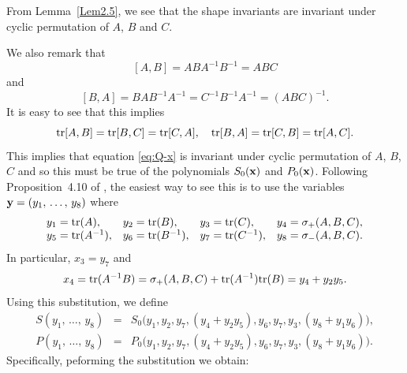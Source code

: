 \documentclass[11pt]{amsart}
\numberwithin{equation}{section}
\begin{document}
From Lemma~\ref{Lem2.5}, we see that
the shape invariants are invariant under cyclic permutation
of $A$, $B$ and $C$.

We also remark that 
$$
[A,B]=ABA^{-1}B^{-1}=ABC
$$ 
and 
$$
[B,A]=BAB^{-1}A^{-1}=C^{-1}B^{-1}A^{-1}=(ABC)^{-1}.
$$ 
It is easy to see that this implies 
$$
{\rm tr}[A,B]={\rm tr}[B,C]={\rm tr}[C,A],\quad {\rm tr}[B,A]={\rm tr}[C,B]={\rm tr}[A,C].
$$
This implies that equation \eqref{eq:Q-x} is invariant under cyclic permutation of $A$, $B$, $C$ and so this must be true
of the polynomials $S_0({\bf x})$ and $P_0({\bf x})$. Following Proposition~4.10 of \cite{Par}, the easiest way to see this is to use 
the variables
${\bf y}=(y_1,\,\ldots,\, y_8)$ where
\begin{equation}
	\begin{array}{llll} 
	y_1={\rm tr}(A),& y_2={\rm tr}(B),& y_3={\rm tr}(C),& y_4=\sigma_+(A,B,C), \\ 
	y_5={\rm tr}(A^{-1}), & y_6={\rm tr}(B^{-1}), & y_7={\rm tr}(C^{-1}), & y_8=\sigma_-(A,B,C).
    \end{array}
\end{equation}
In particular, $x_3=y_7$ and 
$$
x_4={\rm tr}(A^{-1}B)=\sigma_+(A,B,C)+{\rm tr}(A^{-1}){\rm tr}(B)=y_4+y_2y_5.
$$
Using this substitution, we define
\begin{eqnarray*}
S(y_1,\,\ldots,\,y_8) & = & S_0\bigl(y_1,y_2,y_7,(y_4+y_2y_5),y_6,y_7,y_3,(y_8+y_1y_6)\bigr), \\
P(y_1,\,\ldots,\,y_8) & = & P_0\bigl(y_1,y_2,y_7,(y_4+y_2y_5),y_6,y_7,y_3,(y_8+y_1y_6)\bigr).
\end{eqnarray*}
Specifically, peforming the substitution we obtain:
\end{document}
